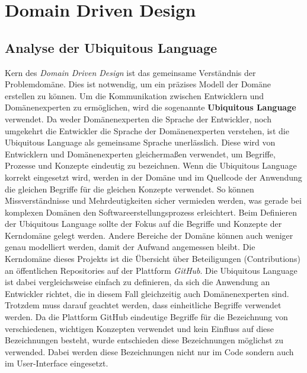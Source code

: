 \chapter{Domain Driven Design}

\section{Analyse der Ubiquitous Language}
\label{sec:ubiq_lang}

Kern des \textit{Domain Driven Design} ist das gemeinsame Verständnis der Problemdomäne.
Dies ist notwendig, um ein präzises Modell der Domäne erstellen zu können.
Um die Kommunikation zwischen Entwicklern und Domänenexperten zu ermöglichen, wird die sogenannte \textbf{Ubiquitous  Language} verwendet.
Da weder Domänenexperten die Sprache der Entwickler, noch umgekehrt die Entwickler die Sprache der Domänenexperten verstehen, ist die Ubiquitous Language als gemeinsame Sprache unerlässlich.
Diese wird von Entwicklern und Domänenexperten gleichermaßen verwendet, um Begriffe, Prozesse und Konzepte eindeutig zu bezeichnen.
Wenn die Ubiquitous Language korrekt eingesetzt wird, werden in der Domäne und im Quellcode der Anwendung die gleichen Begriffe für die gleichen Konzepte verwendet.
So können Missverständnisse und Mehrdeutigkeiten sicher vermieden werden, was gerade bei komplexen Domänen den Softwareerstellungsprozess erleichtert.
Beim Definieren der Ubiquitous Language sollte der Fokus auf die Begriffe und Konzepte der Kerndomäne gelegt werden.
Andere Bereiche der Domäne können auch weniger genau modelliert werden, damit der Aufwand angemessen bleibt.
\newline
\newline
Die Kerndomäne dieses Projekts ist die Übersicht über Beteiligungen (Contributions) an öffentlichen Repositories auf der Plattform \textit{GitHub}.
Die Ubiquitous Language ist dabei vergleichsweise einfach zu definieren, da sich die Anwendung an Entwickler richtet, die in diesem Fall gleichzeitig auch Domänenexperten sind.
Trotzdem muss darauf geachtet werden, dass einheitliche Begriffe verwendet werden.
Da die Plattform GitHub eindeutige Begriffe für die Bezeichnung von verschiedenen, wichtigen Konzepten verwendet und kein Einfluss auf diese Bezeichnungen besteht, wurde entschieden diese Bezeichnungen möglichst zu verwended.
Dabei werden diese Bezeichnungen nicht nur im Code sondern auch im User-Interface eingesetzt.

